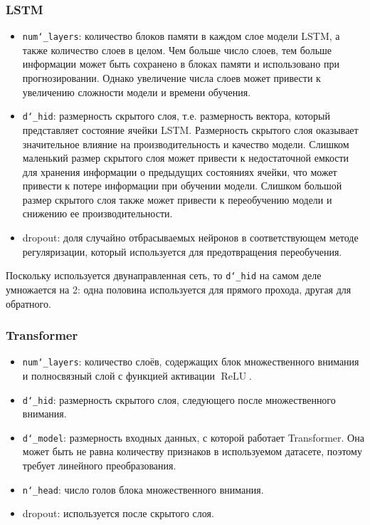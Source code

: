\documentclass[diploma]{nanolab2015}
\DeclareMathOperator{\ReLU}{ReLU}
\begin{document}
\subsubsection{LSTM}
\begin{itemize}
    \item \texttt{num\char`_layers}: количество блоков памяти в каждом слое модели LSTM, а также количество слоев в целом. Чем больше число слоев, тем больше информации может быть сохранено в блоках памяти и использовано при прогнозировании. Однако увеличение числа слоев может привести к увеличению сложности модели и времени обучения.
    \item \texttt{d\char`_hid}: размерность скрытого слоя, т.е. размерность вектора, который представляет состояние ячейки LSTM. Размерность скрытого слоя оказывает значительное влияние на производительность и качество модели. Слишком маленький размер скрытого слоя может привести к недостаточной емкости для хранения информации о предыдущих состояниях ячейки, что может привести к потере информации при обучении модели. Слишком большой размер скрытого слоя также может привести к переобучению модели и снижению ее производительности.
    \item dropout: доля случайно отбрасываемых нейронов в соответствующем методе регуляризации, который используется для предотвращения переобучения.
\end{itemize}

Поскольку используется двунаправленная сеть, то \texttt{d\char`_hid} на самом деле умножается на 2: одна половина используется для прямого прохода, другая для обратного.

\subsubsection{Transformer}
\begin{itemize}
    \item \texttt{num\char`_layers}: количество слоёв, содержащих блок множественного внимания и полносвязный слой с функцией активации $\ReLU$.
    \item \texttt{d\char`_hid}: размерность скрытого слоя, следующего после множественного внимания.
    \item \texttt{d\char`_model}: размерность входных данных, с которой работает Transformer. Она может быть не равна количеству признаков в используемом датасете, поэтому требует линейного преобразования.
    \item \texttt{n\char`_head}: число голов блока множественного внимания.
    \item dropout: используется после скрытого слоя.
\end{itemize}
\end{document}
